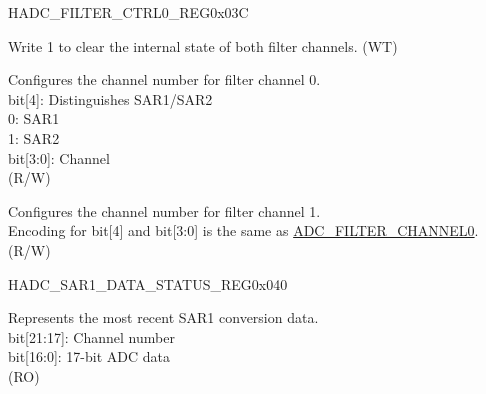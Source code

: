 \begin{register}{H}{ADC\_FILTER\_CTRL0\_REG}{0x03C}\label{regdesc:ADCFILTERCTRL0REG}
%
%
%
%
%
\regnewline%
\begin{regdesc}\begin{reglist}
\label{fielddesc:ADCFILTERRESET}\item [ADC\_FILTER\_RESET] Write 1 to clear the internal state of both filter channels. (WT)
\label{fielddesc:ADCFILTERCHANNEL0}\item [ADC\_FILTER\_CHANNEL0] Configures the channel number for filter channel 0.\\
bit[4]: Distinguishes SAR1/SAR2\\
0: SAR1\\
1: SAR2\\
bit[3:0]: Channel\\
(R/W)
\label{fielddesc:ADCFILTERCHANNEL1}\item [ADC\_FILTER\_CHANNEL1] Configures the channel number for filter channel 1.\\
Encoding for bit[4] and bit[3:0] is the same as \hyperref[fielddesc:ADCFILTERCHANNEL0]{ADC\_FILTER\_CHANNEL0}.\\
(R/W)
\end{reglist}\end{regdesc}
\end{register}


\begin{register}{H}{ADC\_SAR1\_DATA\_STATUS\_REG}{0x040}\label{regdesc:ADCSAR1DATASTATUSREG}
%
%
\regnewline%
\begin{regdesc}\begin{reglist}
\label{fielddesc:ADCAPBSARADC1DATA}\item [ADC\_APB\_SARADC1\_DATA] Represents the most recent SAR1 conversion data.\\
bit[21:17]: Channel number\\
bit[16:0]: 17-bit ADC data\\
(RO)
\end{reglist}\end{regdesc}
\end{register}


